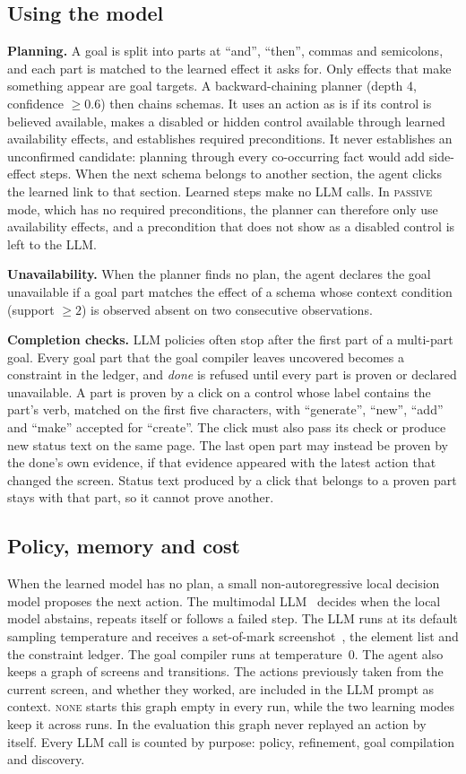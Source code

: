 \documentclass[conference]{IEEEtran}
\newcommand{\modeNone}{\textsc{none}}
\newcommand{\modePassive}{\textsc{passive}}
\begin{document}
\subsection{Using the model}
\textbf{Planning.} A goal is split into parts at ``and'', ``then'', commas and semicolons, and each part is matched to the learned effect it asks for. Only effects that make something appear are goal targets. A backward-chaining planner (depth 4, confidence $\ge 0.6$) then chains schemas. It uses an action as is if its control is believed available, makes a disabled or hidden control available through learned availability effects, and establishes required preconditions. It never establishes an unconfirmed candidate: planning through every co-occurring fact would add side-effect steps. When the next schema belongs to another section, the agent clicks the learned link to that section. Learned steps make no LLM calls. In \modePassive{} mode, which has no required preconditions, the planner can therefore only use availability effects, and a precondition that does not show as a disabled control is left to the LLM.

\textbf{Unavailability.} When the planner finds no plan, the agent declares the goal unavailable if a goal part matches the effect of a schema whose context condition (support $\ge 2$) is observed absent on two consecutive observations.

\textbf{Completion checks.} LLM policies often stop after the first part of a multi-part goal. Every goal part that the goal compiler leaves uncovered becomes a constraint in the ledger, and \emph{done} is refused until every part is proven or declared unavailable. A part is proven by a click on a control whose label contains the part's verb, matched on the first five characters, with ``generate'', ``new'', ``add'' and ``make'' accepted for ``create''. The click must also pass its check or produce new status text on the same page. The last open part may instead be proven by the done's own evidence, if that evidence appeared with the latest action that changed the screen. Status text produced by a click that belongs to a proven part stays with that part, so it cannot prove another.

\subsection{Policy, memory and cost}
When the learned model has no plan, a small non-autoregressive local decision model proposes the next action. The multimodal LLM~\cite{gemini2023} decides when the local model abstains, repeats itself or follows a failed step. The LLM runs at its default sampling temperature and receives a set-of-mark screenshot~\cite{yang2023som}, the element list and the constraint ledger. The goal compiler runs at temperature~0. The agent also keeps a graph of screens and transitions. The actions previously taken from the current screen, and whether they worked, are included in the LLM prompt as context. \modeNone{} starts this graph empty in every run, while the two learning modes keep it across runs. In the evaluation this graph never replayed an action by itself. Every LLM call is counted by purpose: policy, refinement, goal compilation and discovery.
\end{document}
